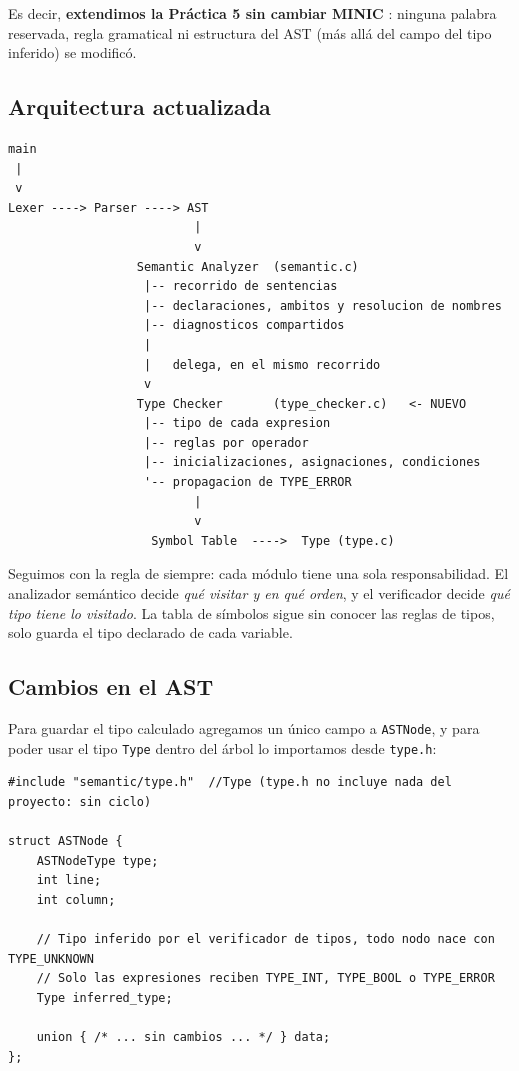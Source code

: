 \documentclass[12pt,letterpaper]{article}
\newcommand{\minic}{
  {M\footnotesize INI\normalsize C}
}
\begin{document}
Es decir, \textbf{extendimos la Práctica 5 sin cambiar \minic{}}: ninguna palabra reservada, regla gramatical ni
estructura del AST (más allá del campo del tipo inferido) se modificó.

\subsection*{Arquitectura actualizada}

\begin{verbatim}
main
 |
 v
Lexer ----> Parser ----> AST
                          |
                          v
                  Semantic Analyzer  (semantic.c)
                   |-- recorrido de sentencias
                   |-- declaraciones, ambitos y resolucion de nombres
                   |-- diagnosticos compartidos
                   |
                   |   delega, en el mismo recorrido
                   v
                  Type Checker       (type_checker.c)   <- NUEVO
                   |-- tipo de cada expresion
                   |-- reglas por operador
                   |-- inicializaciones, asignaciones, condiciones
                   '-- propagacion de TYPE_ERROR
                          |
                          v
                    Symbol Table  ---->  Type (type.c)
\end{verbatim}

Seguimos con la regla de siempre: cada módulo tiene una sola responsabilidad. El analizador semántico decide
\emph{qué visitar y en qué orden}, y el verificador decide \emph{qué tipo tiene lo visitado}. La tabla de
símbolos sigue sin conocer las reglas de tipos, solo guarda el tipo declarado de cada variable.

\subsection*{Cambios en el AST}

Para guardar el tipo calculado agregamos un único campo a \texttt{ASTNode}, y para poder usar el tipo
\texttt{Type} dentro del árbol lo importamos desde \texttt{type.h}:

\begin{lstlisting}[style=modernc, caption={Cambio en \texttt{ast.h}: el nodo guarda su tipo inferido.}]
#include "semantic/type.h"  //Type (type.h no incluye nada del proyecto: sin ciclo)

struct ASTNode {
    ASTNodeType type;
    int line;
    int column;

    // Tipo inferido por el verificador de tipos, todo nodo nace con TYPE_UNKNOWN
    // Solo las expresiones reciben TYPE_INT, TYPE_BOOL o TYPE_ERROR
    Type inferred_type;

    union { /* ... sin cambios ... */ } data;
};
\end{lstlisting}
\end{document}
